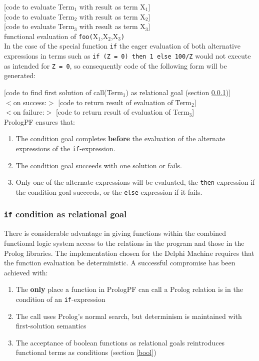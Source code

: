 [code to evaluate Term$_1$ with result as term X$_1$] \\[1mm]
[code to evaluate Term$_2$ with result as term X$_2$] \\[1mm]
[code to evaluate Term$_3$ with result as term X$_3$] \\[1mm]
functional evaluation of \texttt{foo(}X$_1$,X$_2$,X$_3$\texttt{)}\\

In the case of the special function \texttt{if} the eager evaluation of both
alternative expressions in terms such as 
\texttt{if (Z = 0) then 1 else 100/Z} would
not execute as intended for \texttt{Z = 0}, so consequently
code of the following form will be generated:

[code to find first solution of call(Term$_1$)
as relational goal (section \ref{if:cond})] \\[1mm]
$<$on success:$>$ [code to return result of evaluation of Term$_2$] \\[1mm]
$<$on failure:$>$ [code to return result of evaluation of Term$_3$] \\

PrologPF ensures that:
\begin{enumerate}
\item{The condition goal completes \textbf{before} the evaluation of the
  alternate expressions of the \texttt{if}-expression.}
\item{The condition goal succeeds with one solution or fails.}
\item{Only one of the alternate expressions will be evaluated, the \texttt{then}
  expression if the condition goal succeeds, or the \texttt{else} expression
  if it fails.}
\end{enumerate}

\subsubsection{\texttt{if} condition as relational goal}
\label{if:cond}

There is considerable advantage in giving functions within the combined
functional logic system access to the relations in the program and those in
the Prolog libraries.  The implementation chosen for the Delphi Machine
requires that the function evaluation be deterministic.  A successful
compromise has been achieved with:
\begin{enumerate}
\item{The \textbf{only} place a function in PrologPF can call a Prolog
  relation is in the condition of an \texttt{if}-expression}
\item{The call uses Prolog's normal search, but determinism is maintained with
  first-solution semantics}
\item{The acceptance of boolean functions as relational goals reintroduces
  functional terms as conditions (section \ref{bool})}
\end{enumerate}

